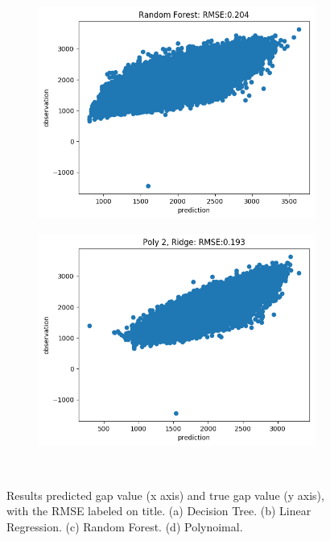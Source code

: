 \documentclass[11pt]{article}
\begin{document}
\begin{figure}[]
\begin{subfigure}[!t]{0.2\textwidth}
        \includegraphics[width=\textwidth]{Random_Forest_pred.png}
    \end{subfigure}
            \begin{subfigure}[!t]{0.2\textwidth}
        \includegraphics[width=\textwidth]{Poly_2_Ridge_pred.png}
    \end{subfigure}\\
        \caption{Results predicted gap value (x axis) and true gap value (y axis), with the RMSE labeled on title. (a) Decision Tree. (b) Linear Regression. (c) Random Forest. (d) Polynoimal.}
            \label{fig:Prediction}
\end{figure}
\end{document}
